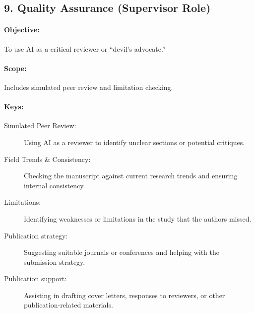 \subsection*{9. Quality Assurance (Supervisor Role)}
\paragraph{Objective:} To use \gls{AI} as a critical reviewer or “devil's advocate.”
\paragraph{Scope:} Includes simulated peer review and limitation checking.
\paragraph{Keys:}
\begin{description}
    \item[Simulated Peer Review:] Using \gls{AI} as a reviewer to identify unclear sections or potential critiques.
    \item[Field Trends \& Consistency:] Checking the manuscript against current research trends and ensuring internal consistency.
    \item[Limitations:] Identifying weaknesses or limitations in the study that the authors missed.
    \item[Publication strategy:] Suggesting suitable journals or conferences and helping with the submission strategy.
    \item[Publication support:] Assisting in drafting cover letters, responses to reviewers, or other publication-related materials.
\end{description}

\endgroup
